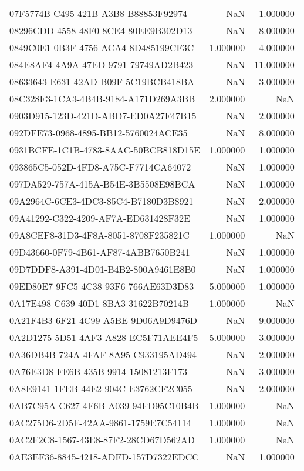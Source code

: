 \begin{tabular}{lrr}
07F5774B-C495-421B-A3B8-B88853F92974 & NaN & 1.000000 \\
08296CDD-4558-48F0-8CE4-80EE9B302D13 & NaN & 8.000000 \\
0849C0E1-0B3F-4756-ACA4-8D485199CF3C & 1.000000 & 4.000000 \\
084E8AF4-4A9A-47ED-9791-79749AD2B423 & NaN & 11.000000 \\
08633643-E631-42AD-B09F-5C19BCB418BA & NaN & 3.000000 \\
08C328F3-1CA3-4B4B-9184-A171D269A3BB & 2.000000 & NaN \\
0903D915-123D-421D-ABD7-ED0A27F47B15 & NaN & 2.000000 \\
092DFE73-0968-4895-BB12-5760024ACE35 & NaN & 8.000000 \\
0931BCFE-1C1B-4783-8AAC-50BCB818D15E & 1.000000 & 1.000000 \\
093865C5-052D-4FD8-A75C-F7714CA64072 & NaN & 1.000000 \\
097DA529-757A-415A-B54E-3B5508E98BCA & NaN & 1.000000 \\
09A2964C-6CE3-4DC3-85C4-B7180D3B8921 & NaN & 2.000000 \\
09A41292-C322-4209-AF7A-ED631428F32E & NaN & 1.000000 \\
09A8CEF8-31D3-4F8A-8051-8708F235821C & 1.000000 & NaN \\
09D43660-0F79-4B61-AF87-4ABB7650B241 & NaN & 1.000000 \\
09D7DDF8-A391-4D01-B4B2-800A9461E8B0 & NaN & 1.000000 \\
09ED80E7-9FC5-4C38-93F6-766AE63D3D83 & 5.000000 & 1.000000 \\
0A17E498-C639-40D1-8BA3-31622B70214B & 1.000000 & NaN \\
0A21F4B3-6F21-4C99-A5BE-9D06A9D9476D & NaN & 9.000000 \\
0A2D1275-5D51-4AF3-A828-EC5F71AEE4F5 & 5.000000 & 3.000000 \\
0A36DB4B-724A-4FAF-8A95-C933195AD494 & NaN & 2.000000 \\
0A76E3D8-FE6B-435B-9914-15081213F173 & NaN & 3.000000 \\
0A8E9141-1FEB-44E2-904C-E3762CF2C055 & NaN & 2.000000 \\
0AB7C95A-C627-4F6B-A039-94FD95C10B4B & 1.000000 & NaN \\
0AC275D6-2D5F-42AA-9861-1759E7C54114 & 1.000000 & NaN \\
0AC2F2C8-1567-43E8-87F2-28CD67D562AD & 1.000000 & NaN \\
0AE3EF36-8845-4218-ADFD-157D7322EDCC & NaN & 1.000000 \\

\end{tabular}
